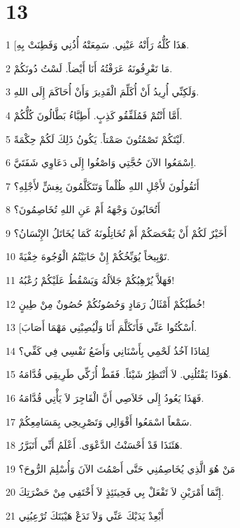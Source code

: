 \chapter{13}

\par 1 [هَذَا كُلُّهُ رَأَتْهُ عَيْنِي. سَمِعَتْهُ أُذُنِي وَفَطِنَتْ بِهِ.
\par 2 مَا تَعْرِفُونَهُ عَرَفْتُهُ أَنَا أَيْضاً. لَسْتُ دُونَكُمْ.
\par 3 وَلَكِنِّي أُرِيدُ أَنْ أُكَلِّمَ الْقَدِيرَ وَأَنْ أُحَاكَمَ إِلَى اللهِ.
\par 4 أَمَّا أَنْتُمْ فَمُلَفِّقُو كَذِبٍ. أَطِبَّاءُ بَطَّالُونَ كُلُّكُمْ.
\par 5 لَيْتَكُمْ تَصْمُتُونَ صَمْتاً. يَكُونُ ذَلِكَ لَكُمْ حِكْمَةً.
\par 6 اِسْمَعُوا الآنَ حُجَّتِي وَاصْغُوا إِلَى دَعَاوِي شَفَتَيَّ.
\par 7 أَتَقُولُونَ لأَجْلِ اللهِ ظُلْماً وَتَتَكَلَّمُونَ بِغِشٍّ لأَجْلِهِ؟
\par 8 أَتُحَابُونَ وَجْهَهُ أَمْ عَنِ اللهِ تُخَاصِمُونَ؟
\par 9 أَخَيْرٌ لَكُمْ أَنْ يَفْحَصَكُمْ أَمْ تُخَاتِلُونَهُ كَمَا يُخَاتَلُ الإِنْسَانُ؟
\par 10 تَوْبِيخاً يُوَبِّخُكُمْ إِنْ حَابَيْتُمُ الْوُجُوهَ خِفْيَةً.
\par 11 فَهَلاَّ يُرْهِبُكُمْ جَلاَلُهُ وَيَسْقُطُ عَلَيْكُمْ رُعْبُهُ!
\par 12 خُطَبُكُمْ أَمْثَالُ رَمَادٍ وَحُصُونُكُمْ حُصُونٌ مِنْ طِينٍ!
\par 13 [اُسْكُتُوا عَنِّي فَأَتَكَلَّمَ أَنَا وَلْيُصِبْنِي مَهْمَا أَصَابَ.
\par 14 لِمَاذَا آخُذُ لَحْمِي بِأَسْنَانِي وَأَضَعُ نَفْسِي فِي كَفِّي؟
\par 15 هُوَذَا يَقْتُلُنِي. لاَ أَنْتَظِرُ شَيْئاً. فَقَطْ أُزَكِّي طَرِيقِي قُدَّامَهُ.
\par 16 فَهَذَا يَعُودُ إِلَى خَلاَصِي أَنَّ الْفَاجِرَ لاَ يَأْتِي قُدَّامَهُ.
\par 17 سَمْعاً اسْمَعُوا أَقْوَالِي وَتَصْرِيحِي بِمَسَامِعِكُمْ.
\par 18 هَئَنَذَا قَدْ أَحْسَنْتُ الدَّعْوَى. أَعْلَمُ أَنِّي أَتَبَرَّرُ.
\par 19 مَنْ هُوَ الَّذِي يُخَاصِمُنِي حَتَّى أَصْمُتَ الآنَ وَأُسْلِمَ الرُّوحَ؟
\par 20 إِنَّمَا أَمْرَيْنِ لاَ تَفْعَلْ بِي فَحِينَئِذٍ لاَ أَخْتَفِي مِنْ حَضْرَتِكَ.
\par 21 أَبْعِدْ يَدَيْكَ عَنِّي وَلاَ تَدَعْ هَيْبَتَكَ تُرْعِبُنِي
